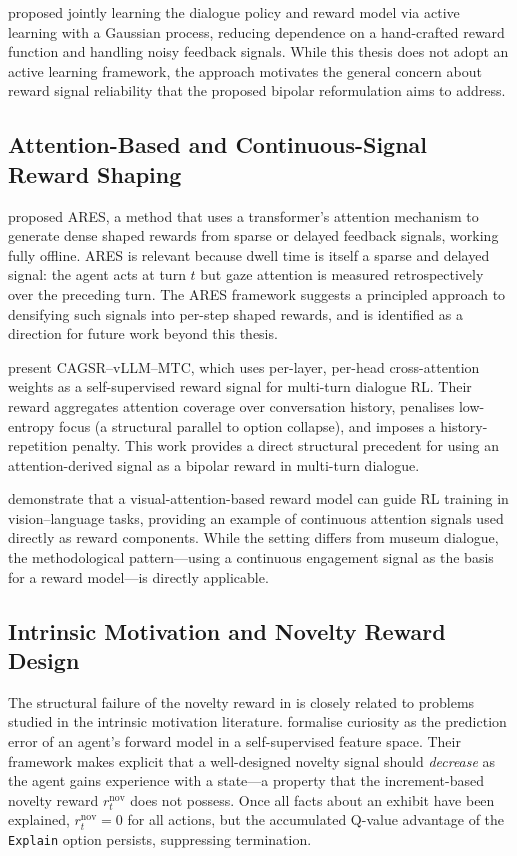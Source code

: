 \documentclass[12pt,a4paper]{article}
\newcommand{\rnov}{r^{\mathrm{nov}}_t}
\begin{document}
\citet{su2016} proposed jointly learning the dialogue policy and reward model via active learning with a Gaussian process, reducing dependence on a hand-crafted reward function and handling noisy feedback signals. While this thesis does not adopt an active learning framework, the \citet{su2016} approach motivates the general concern about reward signal reliability that the proposed bipolar reformulation aims to address.

\subsection{Attention-Based and Continuous-Signal Reward Shaping}

\citet{holmes2025} proposed ARES, a method that uses a transformer's attention mechanism to generate dense shaped rewards from sparse or delayed feedback signals, working fully offline. ARES is relevant because dwell time is itself a sparse and delayed signal: the agent acts at turn $t$ but gaze attention is measured retrospectively over the preceding turn. The ARES framework suggests a principled approach to densifying such signals into per-step shaped rewards, and is identified as a direction for future work beyond this thesis.

\citet{kiruluta2025} present CAGSR--vLLM--MTC, which uses per-layer, per-head cross-attention weights as a self-supervised reward signal for multi-turn dialogue RL. Their reward aggregates attention coverage over conversation history, penalises low-entropy focus (a structural parallel to option collapse), and imposes a history-repetition penalty. This work provides a direct structural precedent for using an attention-derived signal as a bipolar reward in multi-turn dialogue.

\citet{jian2025} demonstrate that a visual-attention-based reward model can guide RL training in vision--language tasks, providing an example of continuous attention signals used directly as reward components. While the setting differs from museum dialogue, the methodological pattern---using a continuous engagement signal as the basis for a reward model---is directly applicable.

\subsection{Intrinsic Motivation and Novelty Reward Design}

The structural failure of the novelty reward in \citet{bourdon2025} is closely related to problems studied in the intrinsic motivation literature. \citet{pathak2017} formalise curiosity as the prediction error of an agent's forward model in a self-supervised feature space. Their framework makes explicit that a well-designed novelty signal should \emph{decrease} as the agent gains experience with a state---a property that the increment-based novelty reward $\rnov$ does not possess. Once all facts about an exhibit have been explained, $\rnov = 0$ for all actions, but the accumulated Q-value advantage of the \texttt{Explain} option persists, suppressing termination.
\end{document}
